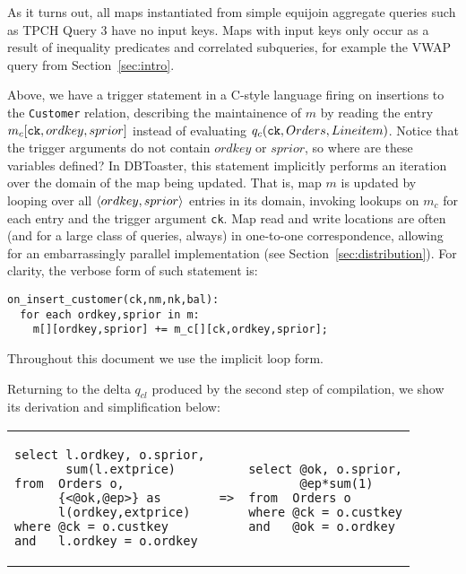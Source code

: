 \noindent
As it turns out, all maps instantiated from simple equijoin aggregate queries
such as TPCH Query 3 have no input keys. Maps with input keys only occur as a
result of inequality predicates and correlated subqueries, for example the VWAP
query from Section~\ref{sec:intro}.

Above, we have a trigger statement in a C-style language firing on insertions to
the {\tt Customer} relation, describing the maintainence of $m$ by reading the
entry $m_c[\mbox{{\tt ck}},ordkey,sprior]$ instead of evaluating $q_c(\mbox{{\tt
ck}}, Orders, Lineitem)$. Notice that the trigger arguments do not contain
$ordkey$ or $sprior$, so where are these variables defined? In DBToaster, this
statement implicitly performs an iteration over the domain of the map being
updated. That is, map $m$ is updated by looping over all ${\langle ordkey,sprior\rangle}$
entries in its domain, invoking lookups on $m_c$ for each entry and the trigger
argument {\tt ck}. Map read and write locations are often (and for a large class
of queries, always) in one-to-one correspondence, allowing for an embarrassingly
parallel implementation (see Section~\ref{sec:distribution}). For clarity, the
verbose form of such statement is:

\begin{verbatim}
on_insert_customer(ck,nm,nk,bal):
  for each ordkey,sprior in m:
    m[][ordkey,sprior] += m_c[][ck,ordkey,sprior];
\end{verbatim}

\noindent Throughout this document we use the implicit loop form. 

Returning to the delta $q_{cl}$ produced by the second step of compilation, we
show its derivation and simplification below: 

\vspace{1mm}
\hspace{-5mm}
\begin{tabular}{lcl}
\begin{minipage}{1.5in}
\begin{verbatim}
select l.ordkey, o.sprior,
       sum(l.extprice)
from  Orders o,
      {<@ok,@ep>} as
      l(ordkey,extprice)
where @ck = o.custkey
and   l.ordkey = o.ordkey
\end{verbatim}
\end{minipage}
&
{\tt =>}
&
\hspace{-2mm}
\begin{minipage}{1.3in}
\begin{verbatim}
select @ok, o.sprior,
       @ep*sum(1)
from  Orders o
where @ck = o.custkey
and   @ok = o.ordkey
\end{verbatim}
\end{minipage}
\end{tabular}

